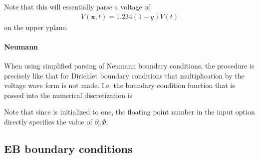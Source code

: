 \documentclass[letterpaper,10pt,english]{sphinxmanual}
\begin{document}
Note that this will essentially parse a voltage of
\begin{equation*}
\begin{split}V(\mathbf{x},t) = 1.234(1-y)V(t)\end{split}
\end{equation*}
on the upper y\sphinxhyphen{}plane.


\paragraph{Neumann}
\label{\detokenize{Solvers/Electrostatics:neumann}}
When using simplified parsing of Neumann boundary conditions, the procedure is precisely like that for Dirichlet boundary conditions  that multiplication by the voltage wave form is not made.
I.e. the boundary condition function that is passed into the numerical discretization is

\begin{sphinxVerbatim}[commandchars=\\\{\},formatcom=\scriptsize]
 

   \PYG{p}{[} \PYG{p}{]}        
       
\end{sphinxVerbatim}

Note that since  is initialized to one, the floating point number in the input option directly specifies the value of \(\partial_n\Phi\).


\subsection{EB boundary conditions}
\label{\detokenize{Solvers/Electrostatics:eb-boundary-conditions}}\label{\detokenize{Solvers/Electrostatics:chap-poissonebbc}}
\end{document}
